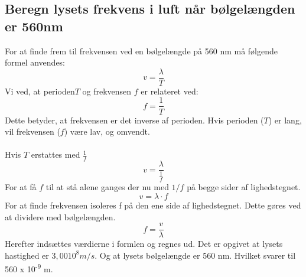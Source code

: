 \subsection{Beregn lysets frekvens i luft når bølgelængden er 560nm}
For at finde frem til frekvensen ved en bølgelængde på 560 nm må følgende formel anvendes:
\begin{equation*}
    v=\frac{\lambda}{T}
\end{equation*}
Vi ved, at perioden\begin{math}T\end{math} og frekvensen \begin{math}f\end{math} er relateret ved:
\begin{equation*}
    f=\frac{1}{T}
\end{equation*}
Dette betyder, at frekvensen er det inverse af perioden. Hvis perioden (\begin{math}T\end{math}) er lang, vil frekvensen (\begin{math}f\end{math}) være lav, og omvendt.\\\\
Hvis \begin{math}T\end{math} erstattes med \begin{math}\frac{1}{f}\end{math}
\begin{equation*}
    v=\frac{\lambda}{\frac{1}{f}}
\end{equation*}
For at få \begin{math}f\end{math} til at stå alene ganges der nu med \begin{math}1/f\end{math} på begge sider af lighedstegnet. 
\begin{equation*}
    v=\lambda \cdot f
\end{equation*}
For at finde frekvensen isoleres f på den ene side af lighedstegnet. Dette gøres ved at dividere med bølgelængden.
\begin{equation*}
    f=\frac{v}{\lambda}
\end{equation*}
Herefter indsættes værdierne i formlen og regnes ud. Det er opgivet at lysets hastighed er \begin{math}3,00 10^{8} m/s\end{math}. Og at lysets bølgelængde er 560 nm. Hvilket svarer til 560 x 10\textsuperscript{-9} m.
